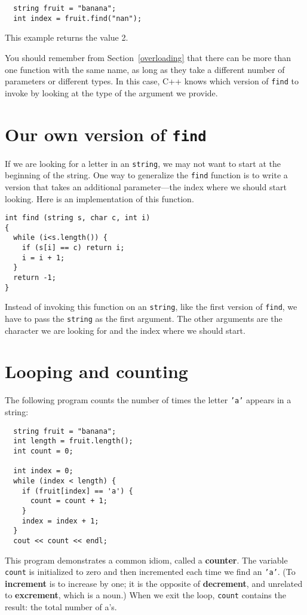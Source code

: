 \begin{lstlisting}
  string fruit = "banana";
  int index = fruit.find("nan");
\end{lstlisting}
%
This example returns the value 2.

You should remember from Section~\ref{overloading} that there
can be more than one function with the same name, as long as they
take a different number of parameters or different types.  In
this case, C++ knows which version of {\tt find} to invoke
by looking at the type of the argument we provide.

\section{Our own version of {\tt find}}

If we are looking for a letter in an {\tt string}, we may
not want to start at the beginning of the string.  One way
to generalize the {\tt find} function is to write a version
that takes an additional parameter---the index where we should
start looking.  Here is an implementation of this function.

\begin{lstlisting}
int find (string s, char c, int i)
{
  while (i<s.length()) {
    if (s[i] == c) return i;
    i = i + 1;
  }
  return -1;
}
\end{lstlisting}
%
Instead of invoking this function on an {\tt string}, like
the first version of {\tt find}, we have to pass the {\tt string}
as the first argument.  The other arguments are the character
we are looking for and the index where we should start.

\section{Looping and counting}
\label{loopcount}

The following program counts the
number of times the letter {\tt 'a'} appears in a string:

\begin{lstlisting}
  string fruit = "banana";
  int length = fruit.length();
  int count = 0;

  int index = 0;
  while (index < length) {
    if (fruit[index] == 'a') {
      count = count + 1;
    }
    index = index + 1;
  }
  cout << count << endl;
\end{lstlisting}
%
This program demonstrates a common idiom, called a {\bf counter}.  The
variable {\tt count} is initialized to zero and then incremented each
time we find an {\tt 'a'}.  (To {\bf increment} is to increase by one;
it is the opposite of {\bf decrement}, and unrelated to {\bf
excrement}, which is a noun.)  When we exit the loop, {\tt count}
contains the result: the total number of a's.

